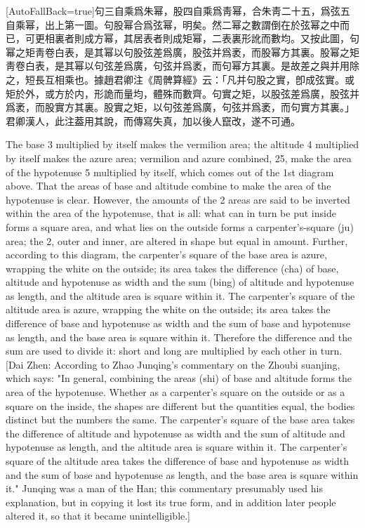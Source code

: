 \documentclass[11pt]{article}
\newcommand{\zhsmall}{\footnotesize\color{black!70}}
\newcommand{\unitlabel}[1]{\marginpar{\raggedleft\tiny\color{gray}#1}}
\newenvironment{unitzh}{\par\CJKfontspec{Noto Serif CJK SC}[AutoFallBack=true]\large\linespread{1.25}\selectfont}{\par}
\newenvironment{uniten}{\par\small\color{black!85}}{\par\medskip}
\begin{document}
\begin{unitzh}\unitlabel{jiuzhang-041.11}句三自乘爲朱幂，股四自乘爲靑幂，合朱靑二十五，爲弦五自乘幂，出上第一圖。句股幂合爲弦幂，明矣。然二幂之數謂倒在於弦幂之中而已，可更相裏者則成方幂，其居表者則成矩幂，二表裏形訛而數均。又按此圖，句幂之矩靑卷白表，是其幂以句股弦差爲廣，股弦并爲袤，而股幂方其裏。股幂之矩靑卷白表，是其幂以句弦差爲廣，句弦并爲袤，而句幂方其裏。是故差之與并用除之，短長互相乘也。{\zhsmall 據趙君卿注《周髀算經》云：「凡并句股之實，卽成弦實。或矩於外，或方於内，形詭而量均，體殊而數齊。句實之矩，以股弦差爲廣，股弦并爲袤，而股實方其裏。股實之矩，以句弦差爲廣，句弦并爲袤，而句實方其裏。」君卿漢人，此注葢用其說，而傳寫失真，加以後人竄改，遂不可通。}\end{unitzh}
\begin{uniten}The base 3 multiplied by itself makes the vermilion area; the altitude 4 multiplied by itself makes the azure area; vermilion and azure combined, 25, make the area of the hypotenuse 5 multiplied by itself, which comes out of the 1st diagram above. That the areas of base and altitude combine to make the area of the hypotenuse is clear. However, the amounts of the 2 areas are said to be inverted within the area of the hypotenuse, that is all: what can in turn be put inside forms a square area, and what lies on the outside forms a carpenter's-square (ju) area; the 2, outer and inner, are altered in shape but equal in amount. Further, according to this diagram, the carpenter's square of the base area is azure, wrapping the white on the outside; its area takes the difference (cha) of base, altitude and hypotenuse as width and the sum (bing) of altitude and hypotenuse as length, and the altitude area is square within it. The carpenter's square of the altitude area is azure, wrapping the white on the outside; its area takes the difference of base and hypotenuse as width and the sum of base and hypotenuse as length, and the base area is square within it. Therefore the difference and the sum are used to divide it: short and long are multiplied by each other in turn. [Dai Zhen: According to Zhao Junqing's commentary on the Zhoubi suanjing, which says: "In general, combining the areas (shi) of base and altitude forms the area of the hypotenuse. Whether as a carpenter's square on the outside or as a square on the inside, the shapes are different but the quantities equal, the bodies distinct but the numbers the same. The carpenter's square of the base area takes the difference of altitude and hypotenuse as width and the sum of altitude and hypotenuse as length, and the altitude area is square within it. The carpenter's square of the altitude area takes the difference of base and hypotenuse as width and the sum of base and hypotenuse as length, and the base area is square within it." Junqing was a man of the Han; this commentary presumably used his explanation, but in copying it lost its true form, and in addition later people altered it, so that it became unintelligible.]\end{uniten}
\end{document}
